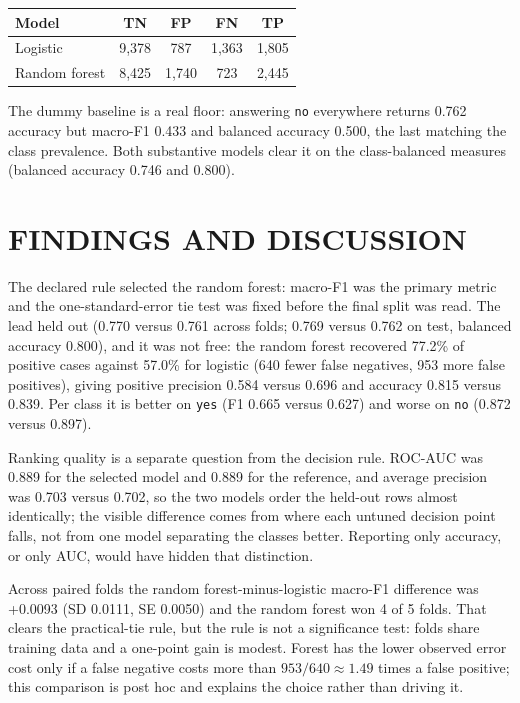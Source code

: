 \documentclass[10pt,a4paper,twocolumn]{article}
\begin{document}
\noindent
\begin{minipage}{\columnwidth}
\centering
{}
\label{tab:confusion}
{\normalsize
\begin{tabularx}{\columnwidth}{@{}LCCCC@{}}
\toprule
{}
Model & TN & FP & FN & TP \\
\midrule
Logistic & 9,378 & 787 & 1,363 & 1,805 \\
Random forest & 8,425 & 1,740 & 723 & 2,445 \\
\bottomrule
\end{tabularx}}
\end{minipage}
\par\vspace{5pt}

The dummy baseline is a real floor: answering \texttt{no} everywhere returns 0.762 accuracy but macro-F1 0.433 and balanced accuracy 0.500, the last matching the class prevalence. Both substantive models clear it on the class-balanced measures (balanced accuracy 0.746 and 0.800).

\section*{FINDINGS AND DISCUSSION}
The declared rule selected the random forest: macro-F1 was the primary
metric and the one-standard-error tie test was fixed before the final split was
read. The lead held out (0.770
versus 0.761 across folds;
0.769 versus 0.762 on test, balanced accuracy
0.800), and it was not free: the random forest
recovered 77.2\% of positive cases against
57.0\% for logistic (640 fewer false negatives, 953 more false positives), giving positive
precision 0.584 versus 0.696 and accuracy
0.815 versus 0.839. Per class it is better on \texttt{yes}
(F1 0.665 versus 0.627) and worse on
\texttt{no} (0.872 versus 0.897).

Ranking quality is a separate question from the decision rule. ROC-AUC was
0.889 for the selected model and 0.889 for the
reference, and average precision was 0.703 versus
0.702, so the two models order the held-out rows almost
identically; the visible difference comes from where each untuned decision point
falls, not from one model separating the classes better. Reporting only accuracy,
or only AUC, would have hidden that distinction.

Across paired folds the random forest-minus-logistic
macro-F1 difference was +0.0093 (SD
0.0111, SE 0.0050) and the
random forest won 4 of
5 folds. That clears the practical-tie rule, but the
rule is not a significance test: folds share training data and a one-point gain is
modest. Forest has the lower observed error cost only if a false negative costs more than $953/640\approx1.49$ times a false positive; this comparison is post hoc and explains the choice rather than driving it.
\end{document}
